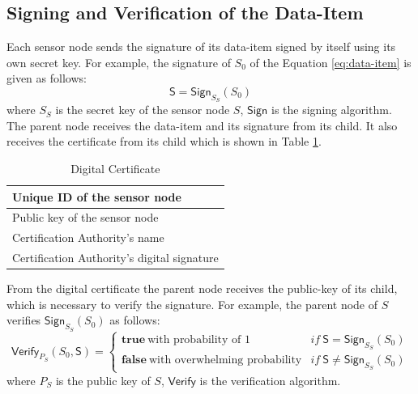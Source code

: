 	\subsection{Signing and Verification of the Data-Item}
		\label{subsection:Signing and Verification of the Data-Item}
		Each sensor node sends the signature of its data-item signed by itself using its own secret key. 
		For example, the signature of $S_{0}$ of the Equation \ref{eq:data-item} is given as follows:
		\begin{equation}
			\label{eq:sign-data-item}
			\textsf{S} = \textsf{Sign}_{S_{S}}(S_{0})
		\end{equation}
		where $S_{S}$ is the secret key of the sensor node $S$, $\textsf{Sign}$ is the signing algorithm.
		The parent node receives the data-item and its signature from its child. 
		It also receives the certificate from its child which is shown in Table \ref{table:digital-certificate}.
		\begin{table}[!htb]	
			\begin{center}
				\begin{tabular}{ |l| }
			    \hline
			    Unique ID of the sensor node \\
			    \hline
			    Public key of the sensor node \\	
			    \hline
			    Certification Authority's name \\
			    \hline
			    Certification Authority's digital signature \\
			    \hline
				\end{tabular}
			\end{center}
	  	\caption{Digital Certificate}
		  \label{table:digital-certificate}
	  \end{table}
	  From the digital certificate the parent node receives the public-key of its child, which is necessary to verify the signature.
	  For example, the parent node of $S$ verifies $\textsf{Sign}_{S_{S}}(S_{0})$ as follows:
	  \begin{equation}
			\textsf{Verify}_{P_{S}}(S_{0},\textsf{S}) = 
			\begin{cases}
			 \textbf{true}\ \mbox{with probability of 1} & if\ \textsf{S} = \textsf{Sign}_{S_{S}}(S_{0})\\
			 \textbf{false}\ \mbox{with overwhelming probability} & if\ \textsf{S} \neq \textsf{Sign}_{S_{S}}(S_{0})
			\end{cases}
			\label{eq:verification}
		\end{equation}
	  where $P_{S}$ is the public key of $S$, $\textsf{Verify}$ is the verification algorithm.
	
